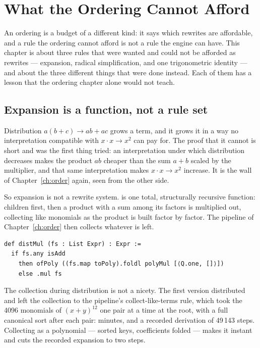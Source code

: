 \chapter{What the Ordering Cannot Afford}\label{ch:cannot}

An ordering is a budget of a different kind: it says which rewrites are affordable, and a rule the
ordering cannot afford is not a rule the engine can have. This chapter is about three rules that
were wanted and could not be afforded as rewrites --- expansion, radical simplification, and one
trigonometric identity --- and about the three different things that were done instead. Each of
them has a lesson that the ordering chapter alone would not teach.

\section{Expansion is a function, not a rule set}

Distribution $a(b + c) \to ab + ac$ grows a term, and it grows it in a way no interpretation
compatible with $x \cdot x \to x^2$ can pay for. The proof that it cannot is short and was the
first thing tried: an interpretation under which distribution decreases makes the product $ab$
cheaper than the sum $a + b$ scaled by the multiplier, and that same interpretation makes
$x \cdot x \to x^2$ increase. It is the wall of Chapter~\ref{ch:order} again, seen from the other
side.

So expansion is not a rewrite system.  is one total, structurally recursive
function: children first, then a product with a sum among its factors is multiplied out, collecting
like monomials as the product is built factor by factor. The pipeline of Chapter~\ref{ch:order}
then collects whatever is left.

\begin{verbatim}
def distMul (fs : List Expr) : Expr :=
  if fs.any isAdd
    then ofPoly ((fs.map toPoly).foldl polyMul [⟨Q.one, []⟩])
    else .mul fs
\end{verbatim}

The collection during distribution is not a nicety. The first version distributed and left the
collection to the pipeline's collect-like-terms rule, which took the 4096 monomials of
$(x+y)^{12}$ one pair at a time at the root, with a full canonical sort after each pair: minutes,
and a recorded derivation of 49\,143 steps. Collecting as a polynomial --- sorted keys, coefficients
folded --- makes it instant and cuts the recorded expansion to two steps.

